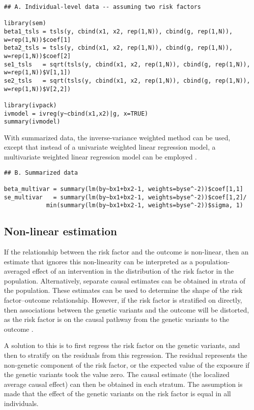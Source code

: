 \documentclass[a4paper,12pt]{article} %
\begin{document}
\begin{lstlisting}
## A. Individual-level data -- assuming two risk factors

library(sem)
beta1_tsls = tsls(y, cbind(x1, x2, rep(1,N)), cbind(g, rep(1,N)), w=rep(1,N))$coef[1]
beta2_tsls = tsls(y, cbind(x1, x2, rep(1,N)), cbind(g, rep(1,N)), w=rep(1,N))$coef[2]
se1_tsls   = sqrt(tsls(y, cbind(x1, x2, rep(1,N)), cbind(g, rep(1,N)), w=rep(1,N))$V[1,1])
se2_tsls   = sqrt(tsls(y, cbind(x1, x2, rep(1,N)), cbind(g, rep(1,N)), w=rep(1,N))$V[2,2])

library(ivpack)
ivmodel = ivreg(y~cbind(x1,x2)|g, x=TRUE)
summary(ivmodel)
\end{lstlisting}

With summarized data, the inverse-variance weighted method can be used, except that instead of a univariate weighted linear regression model, a multivariate weighted linear regression model can be employed \cite{burgess2014pleioajeappendix}.

\begin{lstlisting}
## B. Summarized data

beta_multivar = summary(lm(by~bx1+bx2-1, weights=byse^-2))$coef[1,1]
se_multivar   = summary(lm(by~bx1+bx2-1, weights=byse^-2))$coef[1,2]/
            min(summary(lm(by~bx1+bx2-1, weights=byse^-2))$sigma, 1)
\end{lstlisting}

\clearpage

\subsection{Non-linear estimation}
If the relationship between the risk factor and the outcome is non-linear, then an estimate that ignores this non-linearity can be interpreted as a population-averaged effect of an intervention in the distribution of the risk factor in the population. Alternatively, separate causal estimates can be obtained in strata of the population. These estimates can be used to determine the shape of the risk factor--outcome relationship. However, if the risk factor is stratified on directly, then associations between the genetic variants and the outcome will be distorted, as the risk factor is on the causal pathway from the genetic variants to the outcome \citep{burgess2014nonlin}.

A solution to this is to first regress the risk factor on the genetic variants, and then to stratify on the residuals from this regression. The residual represents the non-genetic component of the risk factor, or the expected value of the exposure if the genetic variants took the value zero. The causal estimate (the localized average causal effect) can then be obtained in each stratum. The assumption is made that the effect of the genetic variants on the risk factor is equal in all individuals.
\end{document}
